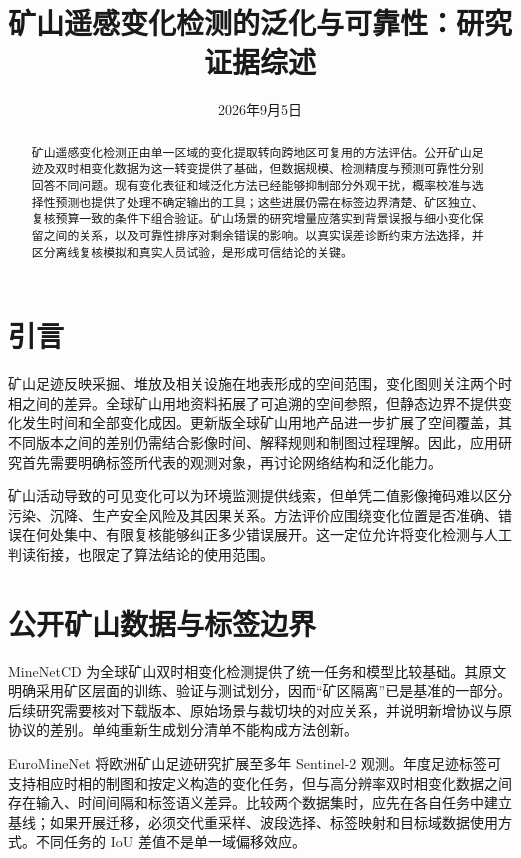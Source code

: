\documentclass[UTF8,a4paper,11pt]{ctexart}
\title{矿山遥感变化检测的泛化与可靠性：研究证据综述}
\author{}
\date{2026年9月5日}
\begin{document}
\maketitle
\begin{abstract}
矿山遥感变化检测正由单一区域的变化提取转向跨地区可复用的方法评估。公开矿山足迹及双时相变化数据为这一转变提供了基础，但数据规模、检测精度与预测可靠性分别回答不同问题。现有变化表征和域泛化方法已经能够抑制部分外观干扰，概率校准与选择性预测也提供了处理不确定输出的工具；这些进展仍需在标签边界清楚、矿区独立、复核预算一致的条件下组合验证。矿山场景的研究增量应落实到背景误报与细小变化保留之间的关系，以及可靠性排序对剩余错误的影响。以真实误差诊断约束方法选择，并区分离线复核模拟和真实人员试验，是形成可信结论的关键。
\end{abstract}

\section{引言}
矿山足迹反映采掘、堆放及相关设施在地表形成的空间范围，变化图则关注两个时相之间的差异。全球矿山用地资料拓展了可追溯的空间参照，但静态边界不提供变化发生时间和全部变化成因\cite{Maus2020Mining}。更新版全球矿山用地产品进一步扩展了空间覆盖，其不同版本之间的差别仍需结合影像时间、解释规则和制图过程理解\cite{Maus2022Mining}。因此，应用研究首先需要明确标签所代表的观测对象，再讨论网络结构和泛化能力。

矿山活动导致的可见变化可以为环境监测提供线索，但单凭二值影像掩码难以区分污染、沉降、生产安全风险及其因果关系。方法评价应围绕变化位置是否准确、错误在何处集中、有限复核能够纠正多少错误展开。这一定位允许将变化检测与人工判读衔接，也限定了算法结论的使用范围。

\section{公开矿山数据与标签边界}
MineNetCD 为全球矿山双时相变化检测提供了统一任务和模型比较基础\cite{Yu2024MineNetCD}。其原文明确采用矿区层面的训练、验证与测试划分，因而“矿区隔离”已是基准的一部分。后续研究需要核对下载版本、原始场景与裁切块的对应关系，并说明新增协议与原协议的差别。单纯重新生成划分清单不能构成方法创新。

EuroMineNet 将欧洲矿山足迹研究扩展至多年 Sentinel-2 观测\cite{Yu2026EuroMineNet}。年度足迹标签可支持相应时相的制图和按定义构造的变化任务，但与高分辨率双时相变化数据之间存在输入、时间间隔和标签语义差异。比较两个数据集时，应先在各自任务中建立基线；如果开展迁移，必须交代重采样、波段选择、标签映射和目标域数据使用方式。不同任务的 IoU 差值不是单一域偏移效应。
\end{document}
